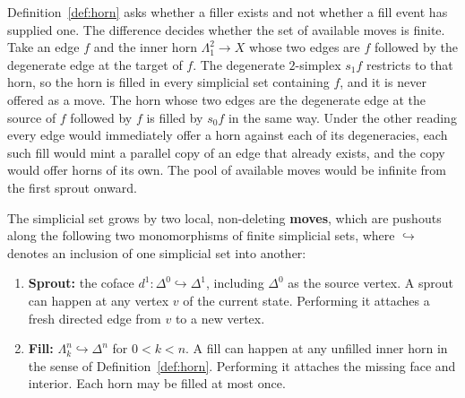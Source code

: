 \begin{remark}
\label{rem:degenerate}
Definition~\ref{def:horn} asks whether a filler exists and not whether a fill event has supplied one.
The difference decides whether the set of available moves is finite.
Take an edge $f$ and the inner horn $\Lambda^2_1 \to X$ whose two edges are $f$ followed by the degenerate edge at the target of $f$.
The degenerate $2$-simplex $s_1 f$ restricts to that horn, so the horn is filled in every simplicial set containing $f$, and it is never offered as a move.
The horn whose two edges are the degenerate edge at the source of $f$ followed by $f$ is filled by $s_0 f$ in the same way.
Under the other reading every edge would immediately offer a horn against each of its degeneracies, each such fill would mint a parallel copy of an edge that already exists, and the copy would offer horns of its own.
The pool of available moves would be infinite from the first sprout onward.
\end{remark}

\begin{definition}[Move]
\label{def:moves}

The simplicial set grows by two local, non-deleting \textbf{moves}, which are pushouts along the following two monomorphisms of finite simplicial sets, where $\hookrightarrow$ denotes an inclusion of one simplicial set into another:

\begin{enumerate}
  \item \textbf{Sprout:} the coface $d^1 : \Delta^0 \hookrightarrow \Delta^1$, including $\Delta^0$ as the source vertex.
        A sprout can happen at any vertex $v$ of the current state.
        Performing it attaches a fresh directed edge from $v$ to a new vertex.
  \item \textbf{Fill:} $\Lambda^n_k \hookrightarrow \Delta^n$ for $0<k<n$.
        A fill can happen at any unfilled inner horn in the sense of Definition~\ref{def:horn}.
        Performing it attaches the missing face and interior.
        Each horn may be filled at most once.
\end{enumerate}

\end{definition}

